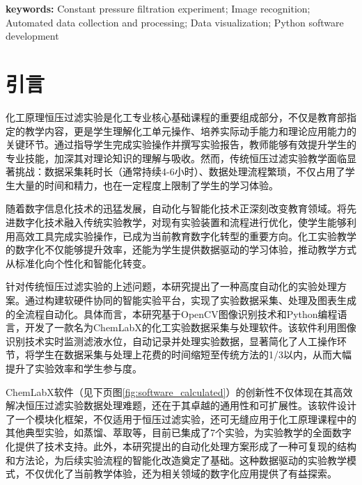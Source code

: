 \documentclass[UTF8,a4paper,fontset=none]{ctexart}
\newcommand{\wuhao}{\fontsize{10.5pt}{15pt}\selectfont}       %
\newcommand{\xiaowu}{\fontsize{9pt}{10.8pt}\selectfont}       %
\newcommand{\keywordsen}[1]{\xiaowu\fontspec{Arial} #1}
\begin{document}
\vspace{0.5em}

\noindent\textbf{keywords:}\keywordsen{Constant pressure filtration experiment; Image recognition; Automated data collection and processing; Data visualization; Python software development}


\wuhao                      %
\rmfamily                   %


\section{引言}

化工原理恒压过滤实验是化工专业核心基础课程的重要组成部分，不仅是教育部指定的教学内容，更是学生理解化工单元操作、培养实际动手能力和理论应用能力的关键环节。通过指导学生完成实验操作并撰写实验报告，教师能够有效提升学生的专业技能，加深其对理论知识的理解与吸收。然而，传统恒压过滤实验教学面临显著挑战：数据采集耗时长（通常持续4-6小时）、数据处理流程繁琐，不仅占用了学生大量的时间和精力，也在一定程度上限制了学生的学习体验。

随着数字信息化技术的迅猛发展，自动化与智能化技术正深刻改变教育领域\textsuperscript{\cite{ref1}}。将先进数字化技术融入传统实验教学，对现有实验装置和流程进行优化，使学生能够利用高效工具完成实验操作，已成为当前教育数字化转型的重要方向。化工实验教学的数字化不仅能够提升效率，还能为学生提供数据驱动的学习体验，推动教学方式从标准化向个性化和智能化转变。

针对传统恒压过滤实验\textsuperscript{\cite{ref2,ref3}}的上述问题，本研究提出了一种高度自动化的实验处理方案。通过构建软硬件协同的智能实验平台，实现了实验数据采集、处理及图表生成的全流程自动化。具体而言，本研究基于OpenCV图像识别技术和Python编程语言，开发了一款名为ChemLabX的化工实验数据采集与处理软件。该软件利用图像识别技术实时监测滤液水位，自动记录并处理实验数据，显著简化了人工操作环节，将学生在数据采集与处理上花费的时间缩短至传统方法的1/3以内，从而大幅提升了实验效率和学生参与度。

ChemLabX软件（见下页图\ref{fig:software_calculated}）的创新性不仅体现在其高效解决恒压过滤实验数据处理难题，还在于其卓越的通用性和可扩展性。该软件设计了一个模块化框架，不仅适用于恒压过滤实验，还可无缝应用于化工原理课程中的其他典型实验，如蒸馏、萃取等，目前已集成了7个实验，为实验教学的全面数字化提供了技术支持。此外，本研究提出的自动化处理方案形成了一种可复现的结构和方法论，为后续实验流程的智能化改造奠定了基础。这种数据驱动的实验教学模式，不仅优化了当前教学体验，还为相关领域的数字化应用提供了有益探索。
\end{document}
